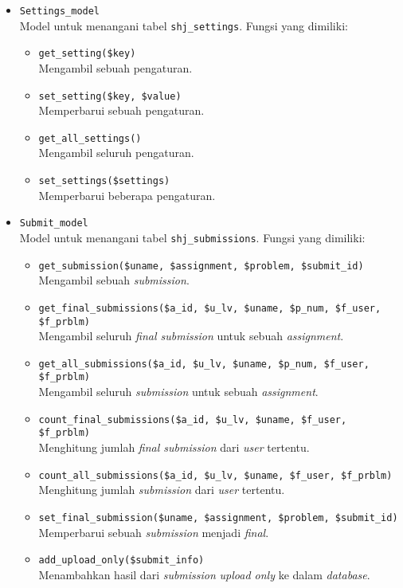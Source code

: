 \begin{itemize}
	\item \verb|Settings_model| \\ Model untuk menangani tabel \verb|shj_settings|. Fungsi yang dimiliki:
	\begin{itemize}
	    \item \verb|get_setting($key)| \\ Mengambil sebuah pengaturan.
	    \item \verb|set_setting($key, $value)| \\ Memperbarui sebuah pengaturan.
	    \item \verb|get_all_settings()| \\ Mengambil seluruh pengaturan.
	    \item \verb|set_settings($settings)| \\ Memperbarui beberapa pengaturan.
	\end{itemize}
	
	\item \verb|Submit_model| \\ Model untuk menangani tabel \verb|shj_submissions|. Fungsi yang dimiliki:
	\begin{itemize}
	    \item \verb|get_submission($uname, $assignment, $problem, $submit_id)| \\ Mengambil sebuah \textit{submission}.
	    \item \verb|get_final_submissions($a_id, $u_lv, $uname, $p_num, $f_user, $f_prblm)| \\ Mengambil seluruh \textit{final submission} untuk sebuah \textit{assignment}.
	    \item \verb|get_all_submissions($a_id, $u_lv, $uname, $p_num, $f_user, $f_prblm)| \\ Mengambil seluruh \textit{submission} untuk sebuah \textit{assignment}.
	    \item \verb|count_final_submissions($a_id, $u_lv, $uname, $f_user, $f_prblm)| \\ Menghitung jumlah \textit{final submission} dari \textit{user} tertentu.
	    \item \verb|count_all_submissions($a_id, $u_lv, $uname, $f_user, $f_prblm)| \\ Menghitung jumlah \textit{submission} dari \textit{user} tertentu.
	    \item \verb|set_final_submission($uname, $assignment, $problem, $submit_id)| \\ Memperbarui sebuah \textit{submission} menjadi \textit{final}.
	    \item \verb|add_upload_only($submit_info)| \\ Menambahkan hasil dari \textit{submission} \textit{upload only} ke dalam \textit{database}.
	\end{itemize}
	

\end{itemize}
